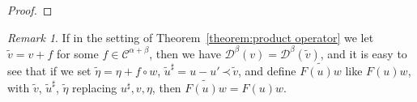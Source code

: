 \documentclass[a4paper,11pt]{article}
\theoremstyle{remark}
\newtheorem{remark}[theorem]{Remark}
\newcommand{\CC}{\ensuremath{\mathscr{C}}}
\newcommand{\CD}{\ensuremath{\mathscr{D}}}
\newcommand{\lpara}{\,\mathord{\prec}\,}
\newcommand{\rpara}{\,\mathord{\succ}\,}
\newcommand{\reso}{\,\mathord{\circ}\,}
\begin{document}
\begin{proof}
\end{proof}

\begin{remark}\label{rmk:product smooth perturbation}
   If in the setting of Theorem~\ref{theorem:product operator} we let $\tilde v = v + f$ for some $f \in \CC^{\alpha+\beta}$, then we have $\CD^\beta(v) = \CD^\beta(\tilde v)$, and it is easy to see that if we set $\tilde \eta = \eta + f \reso w$, $\tilde u^\sharp = u - u'\lpara \tilde v$, and define $\widetilde{F(u)w}$ like $F(u)w$, with $\tilde v$, $\tilde u^\sharp$, $\tilde \eta$ replacing $u^\sharp, v, \eta$, then $\widetilde{F(u)w} = F(u)w$.
\end{remark}
\end{document}
